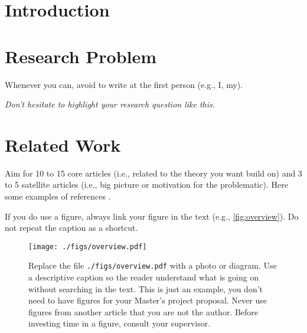 \documentclass[10pt,letterpaper,oneside]{article}
\begin{document}
\makeCustomTitle
\thispagestyle{titlePage}

\section{Introduction}

\lightlipsum[1-2]

\section{Research Problem}

Whenever you can, avoid to write at the first person (e.g., I, my).

\lightlipsum[1]

\begin{center}
\emph{
Don't hesitate to highlight your research question like this.
}
\end{center}

\lightlipsum[1]

\section{Related Work}
Aim for 10 to 15 core articles (i.e., related to the theory you want build on) and 3 to 5 satellite articles (i.e., big picture or motivation for the problematic).
Here some examples of references \cite{Pomerleau2013,Pomerleau2014}.

\lightlipsum[1-3]

If you do use a figure, always link your figure in the text (e.g., \autoref{fig:overview}).
Do not repeat the caption as a shortcut.

\begin{figure}[htb]
\centering
\texttt{[image: ./figs/overview.pdf]}
\caption{
Replace the file \texttt{./figs/overview.pdf} with a photo or diagram.
Use a descriptive caption so the reader understand what is going on without searching in the text.
This is just an example, you don't need to have figures for your Master's project proposal.
Never use figures from another article that you are not the author.
Before investing time in a figure, consult your supervisor.
}
\label{fig:overview}
\end{figure}

\lightlipsum[1-2]
\end{document}
